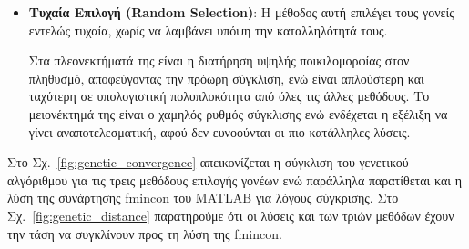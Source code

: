 \documentclass[a4paper,12pt]{article}
\begin{document}
\begin{itemize}
    \item \textbf{Τυχαία Επιλογή (Random Selection)}:
    Η μέθοδος αυτή επιλέγει τους γονείς εντελώς τυχαία, χωρίς να λαμβάνει υπόψη την καταλληλότητά τους.

    Στα πλεονεκτήματά της είναι η διατήρηση υψηλής ποικιλομορφίας στον πληθυσμό, αποφεύγοντας την πρόωρη σύγκλιση,
    ενώ είναι απλούστερη και ταχύτερη σε υπολογιστική πολυπλοκότητα από όλες τις άλλες μεθόδους. Το μειονέκτημά της
    είναι ο χαμηλός ρυθμός σύγκλισης ενώ ενδέχεται η εξέλιξη να γίνει αναποτελεσματική, αφού δεν ευνοούνται οι πιο 
    κατάλληλες λύσεις.
    
\end{itemize}

Στο Σχ.~\ref{fig:genetic_convergence} απεικονίζεται η σύγκλιση του γενετικού αλγόριθμου για τις τρεις μεθόδους
επιλογής γονέων ενώ παράλληλα παρατίθεται και η λύση της συνάρτησης fmincon
του MATLAB για λόγους σύγκρισης.
Στο Σχ.~\ref{fig:genetic_distance} παρατηρούμε ότι οι λύσεις και των τριών μεθόδων έχουν την τάση να συγκλίνουν 
προς τη λύση της fmincon.
\end{document}
